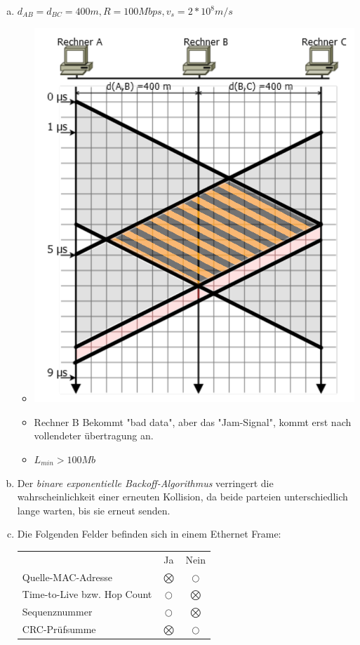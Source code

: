 \pagebreak

\begin{enumerate}[a)]
	\item $d_{AB} = d_{BC} = 400m, R= 100Mbps, v_s=2*10^8m/s$
		\begin{itemize}
			\item \hfill \begin{center}\includegraphics[]{2a.png}\end{center}
			\item Rechner B Bekommt "bad data", aber das "Jam-Signal", kommt erst nach vollendeter übertragung an.
			\item $L_{min} > 100Mb$
		\end{itemize}
	\item Der \emph{binare exponentielle Backoff-Algorithmus} verringert die wahrscheinlichkeit einer erneuten Kollision, da beide parteien unterschiedlich lange warten, bis sie erneut senden.
	\item Die Folgenden Felder befinden sich in einem Ethernet Frame: \\
	\begin{tabular}{p{11.2cm}cc}
												& Ja           & Nein \\
		Quelle-MAC-Adresse						& $\bigotimes$ & $\bigcirc$ \\
		Time-to-Live bzw. Hop Count				& $\bigcirc$   & $\bigotimes$ \\
		Sequenznummer							& $\bigcirc$   & $\bigotimes$ \\
		CRC-Prüfsumme							& $\bigotimes$ & $\bigcirc$     
	\end{tabular}
\end{enumerate}

